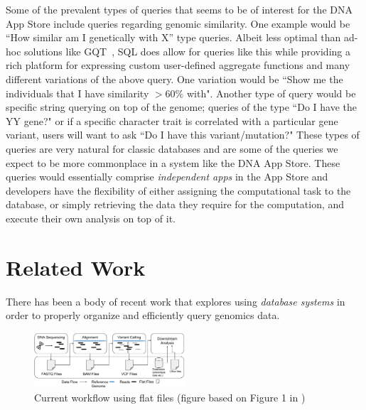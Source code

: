 \documentclass[conference,twocolumn,10pt]{IEEEtran}
\begin{document}
Some of the prevalent types of queries that seems to be of interest for the DNA App Store include queries regarding genomic similarity. One example would be ``How similar am I genetically with X'' type queries. Albeit less optimal than ad-hoc solutions like GQT~\cite{layer2016efficient}, SQL does allow for queries like this while providing a rich platform for expressing custom user-defined aggregate functions and many different variations of the above query. One variation would be ``Show me the individuals that I have similarity $> 60\%$ with". Another type of query would be specific string querying on top of the genome; queries of the type ``Do I have the YY gene?" or if a specific character trait is correlated with a particular gene variant, users will want to ask ``Do I have this variant/mutation?" These types of queries are very natural for classic databases and are some of the queries we expect to be more commonplace in a system like the DNA App Store. These queries would essentially comprise \textit{independent apps} in the App Store and developers have the flexibility of either assigning the computational task to the database, or simply retrieving the data they require for the computation, and execute their own analysis on top of it.

\section{Related Work}
There has been a body of recent work that explores using \textit{database systems} in order to properly organize and efficiently query genomics data.

\begin{figure}[t]
    \centering
    \includegraphics[width=0.50\textwidth]{current-pipeline}
    \caption{Current workflow using flat files (figure based on Figure 1 in \cite{dorok2015relational})}
    \label{fig:current}
    \vspace{-10pt}
\end{figure}
\end{document}
